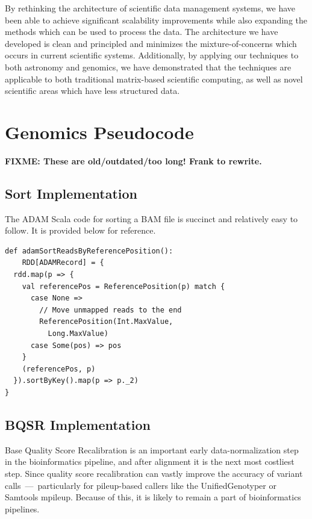 \documentclass{acm_proc_article-sp}
\begin{document}
By rethinking the architecture of scientific data management systems, we have been able to achieve
significant scalability improvements while also expanding the methods which can be used to process
the data. The architecture we have developed is clean and principled and minimizes the
mixture-of-concerns which occurs in current scientific systems. Additionally, by applying our techniques
to both astronomy and genomics, we have demonstrated that the techniques are applicable to both
traditional matrix-based scientific computing, as well as novel scientific areas which have less structured
data.

\clearpage

\appendix


 

\section{Genomics Pseudocode}
\label{sec:genomics-pseudocode}

\textbf{FIXME: These are old/outdated/too long! Frank to rewrite.}

\subsection{Sort Implementation}
\label{sec:sort-implementation}

The ADAM Scala code for sorting a BAM file is succinct and relatively 
easy to follow. It is provided below for reference.

\begin{lstlisting}
def adamSortReadsByReferencePosition():
    RDD[ADAMRecord] = {
  rdd.map(p => {
    val referencePos = ReferencePosition(p) match {
      case None =>
        // Move unmapped reads to the end
        ReferencePosition(Int.MaxValue,
          Long.MaxValue)
      case Some(pos) => pos
    }
    (referencePos, p)
  }).sortByKey().map(p => p._2)
}
\end{lstlisting}

\subsection{BQSR Implementation}
\label{sec:bqsr-implementation}

Base Quality Score Recalibration is an important early data-normalization step in the bioinformatics pipeline, and after alignment
it is the next most costliest step. Since quality score recalibration can vastly improve the accuracy of variant calls~---~particularly for
pileup-based callers like the UnifiedGenotyper or Samtools mpileup. Because of this, it is likely to remain a part of bioinformatics pipelines.
\end{document}
